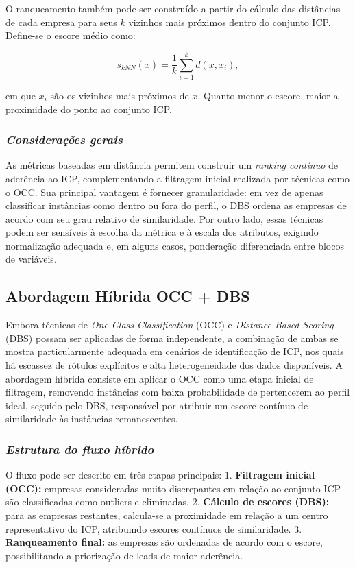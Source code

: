 O ranqueamento também pode ser construído a partir do cálculo das
distâncias de cada empresa para seus $k$ vizinhos mais próximos dentro
do conjunto ICP. Define-se o escore médio como:

\begin{equation}
s_{kNN}(x) = \frac{1}{k} \sum_{i=1}^{k} d(x, x_i),
\end{equation}

em que $x_i$ são os vizinhos mais próximos de $x$. Quanto menor o
escore, maior a proximidade do ponto ao conjunto ICP.

\subsubsection{\textit{Considerações gerais}}

As métricas baseadas em distância permitem construir um \textit{ranking
contínuo} de aderência ao ICP, complementando a filtragem inicial
realizada por técnicas como o OCC. Sua principal vantagem é fornecer
granularidade: em vez de apenas classificar instâncias como dentro ou
fora do perfil, o DBS ordena as empresas de acordo com seu grau relativo
de similaridade. Por outro lado, essas técnicas podem ser sensíveis à
escolha da métrica e à escala dos atributos, exigindo normalização
adequada e, em alguns casos, ponderação diferenciada entre blocos de
variáveis.


\subsection{\textbf{Abordagem Híbrida OCC + DBS}}

Embora técnicas de \textit{One-Class Classification} (OCC) e \textit{Distance-Based
Scoring} (DBS) possam ser aplicadas de forma independente, a combinação
de ambas se mostra particularmente adequada em cenários de identificação
de ICP, nos quais há escassez de rótulos explícitos e alta
heterogeneidade dos dados disponíveis. A abordagem híbrida consiste em
aplicar o OCC como uma etapa inicial de filtragem, removendo instâncias
com baixa probabilidade de pertencerem ao perfil ideal, seguido pelo
DBS, responsável por atribuir um escore contínuo de similaridade às
instâncias remanescentes.

\subsubsection{\textit{Estrutura do fluxo híbrido}}

O fluxo pode ser descrito em três etapas principais:  
1. \textbf{Filtragem inicial (OCC):} empresas consideradas muito discrepantes em relação ao
conjunto ICP são classificadas como outliers e eliminadas.  
2. \textbf{Cálculo de escores (DBS):} para as empresas restantes, calcula-se
a proximidade em relação a um centro representativo do ICP, atribuindo
escores contínuos de similaridade.  
3. \textbf{Ranqueamento final:} as empresas são ordenadas de acordo com o
escore, possibilitando a priorização de leads de maior aderência.

